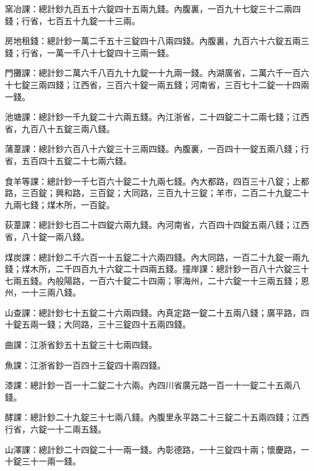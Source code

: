 \begin{pinyinscope}
 窯冶課：總計鈔九百五十六錠四十五兩九錢。內腹裏，一百九十七錠三十二兩四錢；行省，七百五十九錠一十三兩。



 房地租錢：總計鈔一萬二千五十三錠四十八兩四錢。內腹裏，九百六十六錠五兩三錢；行省，一萬一千八十七錠四十三兩一錢。



 門攤課：總計鈔二萬六千八百九十九錠一十九兩一錢。內湖廣省，二萬六千一百六十七錠三兩四錢；江西省，三百六十錠一兩五錢；河南省，三百七十二錠一十四兩一錢。



 池塘課：總計鈔一千九錠二十六兩五錢。內江浙省，二十四錠二十二兩七錢；江西省，九百八十五錠三兩八錢。



 蒲葦課：總計鈔六百八十六錠三十三兩四錢。內腹裏，一百四十一錠五兩八錢；行省，五百四十五錠二十七兩六錢。



 食羊等課：總計鈔一千七百六十錠二十九兩七錢。內大都路，四百三十八錠；上都路，三百錠；興和路，三百錠；大同路，三百九十三錠；羊市，二百二十九錠二十九兩七錢；煤木所，一百錠。



 荻葦課：總計鈔七百二十四錠六兩九錢。內河南省，六百四十四錠五兩八錢；江西省，八十錠一兩八錢。



 煤炭課：總計鈔二千六百一十五錠二十六兩四錢。內大同路，一百二十九錠一兩九錢；煤木所，二千四百九十六錠二十四兩五錢。撞岸課：總計鈔一百八十六錠三十七兩五錢。內般陽路，一百六十錠二十四兩；寧海州，二十六錠一十三兩五錢；恩州，一十三兩八錢。



 山查課：總計鈔七十五錠二十六兩四錢。內真定路一錠二十五兩八錢；廣平路，四十錠五兩一錢；大同路，三十三錠四十五兩四錢。



 曲課：江浙省鈔五十五錠三十七兩四錢。



 魚課：江浙省鈔一百四十三錠四十兩四錢。



 漆課：總計鈔一百一十二錠二十六兩。內四川省廣元路一百一十一錠二十五兩八錢。



 酵課：總計鈔二十九錠三十七兩八錢。內腹里永平路二十三錠二十五兩四錢；江西行省，六錠一十二兩五錢。



 山澤課：總計鈔二十四錠二十一兩一錢。內彰德路，一十三錠四十兩；懷慶路，一十錠三十一兩一錢。




\end{pinyinscope}
